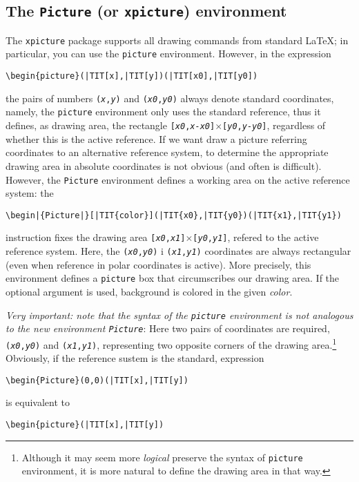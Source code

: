 \documentclass{article}
\makeatletter
\newcommand{\TIT}{\textit}
\newcommand{\TTT}{\texttt}
\newcommand{\environ}[1]{\textnormal{\TTT{#1}}}
\newcommand{\package}[1]{\textnormal{\TTT{#1}}}
\newcommand{\environdef}[1]{%
   \package{#1}\index{#1@\texttt{#1} (environment)}}
\makeatother
\begin{document}
\subsection{The \environ{Picture} (or \environ{xpicture}) environment}
The \package{xpicture} package supports all drawing commands
from standard \LaTeX;
in particular, you can use the \environ{picture} environment.
However, in the expression
\begin{Verbatim}[commandchars=\|\[\]]
\begin{picture}(|TIT[x],|TIT[y])(|TIT[x0],|TIT[y0])
\end{Verbatim}
the pairs of numbers \TTT{(\TIT x,\TIT y)} and
\TTT{(\TIT{x0},\TIT{y0})} always denote standard coordinates,
namely,
the \environ{picture} environment only uses the standard reference,
thus it defines, as drawing area, the rectangle
\TTT{[\TIT{x0},\TIT{x-x0}]}$\times$\TTT{[\TIT{y0},\TIT{y-y0}]},
regardless of whether this is the  active reference.
If we want draw a picture referring coordinates to an alternative reference
system, to determine the appropriate drawing area in absolute coordinates
is not obvious (and often is difficult).
However, the \environdef{Picture} environment 
defines a working area on the active reference system: the
\begin{Verbatim}[commandchars=\|\{\}]
\begin|{Picture|}[|TIT{color}](|TIT{x0},|TIT{y0})(|TIT{x1},|TIT{y1})
\end{Verbatim}
instruction fixes the drawing area
\TTT{[\TIT{x0},\TIT{x1}]}$\times$\TTT{[\TIT{y0},\TIT{y1}]},
refered to the active reference system.
Here, the \TTT{(\TIT{x0},\TIT{y0})} i \TTT{(\TIT{x1},\TIT{y1})}
coordinates are always rectangular
(even when reference in polar coordinates is active).
More precisely, this environment defines a \environ{picture} box
that circumscribes our drawing area.
If the optional argument is used, background is colored in the given 
\textit{color}. 

\emph{Very important: note that the syntax of the 
\environ{picture} environment is not analogous
to the new environment \environ{Picture}}:
Here two pairs of coordinates are required,
\TTT{(\TIT{x0},\TIT{y0})} and \TTT{(\TIT{x1},\TIT{y1})},
representing two opposite corners of the drawing area.\footnote{%
Although it may seem more \emph{logical}
preserve the syntax of \environ{picture} environment, 
it is more natural to define the drawing area in that way.}
Obviously, if the reference sustem is the standard, expression
\begin{Verbatim}[commandchars=\|\[\]]
\begin{Picture}(0,0)(|TIT[x],|TIT[y])
\end{Verbatim}
is equivalent to
\begin{Verbatim}[commandchars=\|\[\]]
\begin{picture}(|TIT[x],|TIT[y])
\end{Verbatim}
\end{document}
